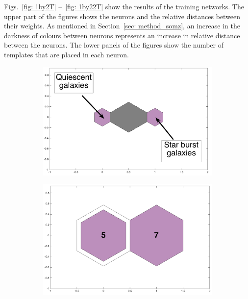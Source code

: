             Figs.~\ref{fig: 1by2T} --~\ref{fig: 1by22T} show the results of the training networks.  %
            The upper part of the figures shows the neurons and the relative distances between their weights. 
            As mentioned in Section~\ref{sec: method_somz}, an increase in the darkness of colours between neurons represents an increase in relative distance between the neurons.
            The lower panels of the figures show the number of  templates that are placed in each neuron. 
            \begin{figure}
                \begin{subfigure}[b]{0.45\textwidth}
                    \centering
                  \includegraphics[width=\textwidth]{images0.01/1d/dist_1_by_2.png}
                \end{subfigure}
                \hfill
                \begin{subfigure}[b]{0.45\textwidth}
                    \centering \includegraphics[width=\textwidth]{images0.01/1d/hit_t_1_by_2.png}

\end{subfigure}
\end{figure}
